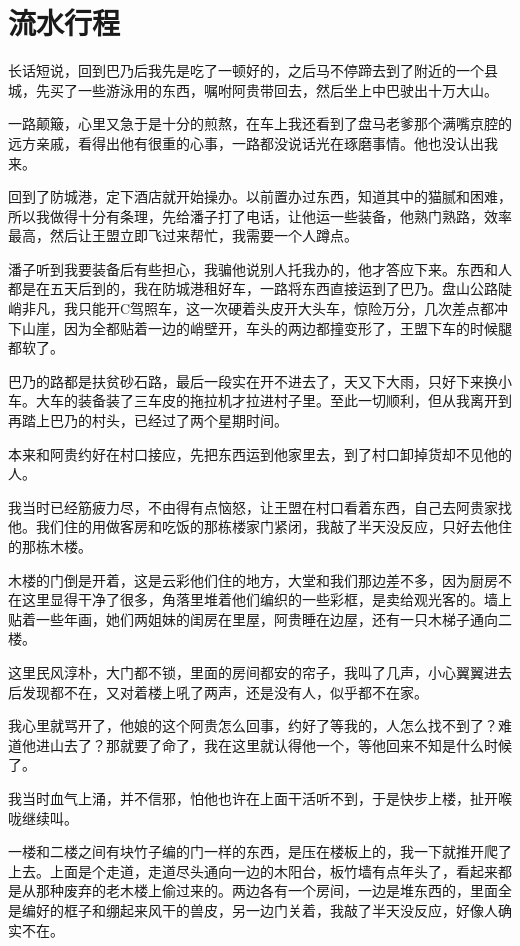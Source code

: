 \chapter{流水行程}

长话短说，回到巴乃后我先是吃了一顿好的，之后马不停蹄去到了附近的一个县城，先买了一些游泳用的东西，嘱咐阿贵带回去，然后坐上中巴驶出十万大山。

一路颠簸，心里又急于是十分的煎熬，在车上我还看到了盘马老爹那个满嘴京腔的远方亲戚，看得出他有很重的心事，一路都没说话光在琢磨事情。他也没认出我来。

回到了防城港，定下酒店就开始操办。以前置办过东西，知道其中的猫腻和困难，所以我做得十分有条理，先给潘子打了电话，让他运一些装备，他熟门熟路，效率最高，然后让王盟立即飞过来帮忙，我需要一个人蹲点。

潘子听到我要装备后有些担心，我骗他说别人托我办的，他才答应下来。东西和人都是在五天后到的，我在防城港租好车，一路将东西直接运到了巴乃。盘山公路陡峭非凡，我只能开C驾照车，这一次硬着头皮开大头车，惊险万分，几次差点都冲下山崖，因为全都贴着一边的峭壁开，车头的两边都撞变形了，王盟下车的时候腿都软了。

巴乃的路都是扶贫砂石路，最后一段实在开不进去了，天又下大雨，只好下来换小车。大车的装备装了三车皮的拖拉机才拉进村子里。至此一切顺利，但从我离开到再踏上巴乃的村头，已经过了两个星期时间。

本来和阿贵约好在村口接应，先把东西运到他家里去，到了村口卸掉货却不见他的人。

我当时已经筋疲力尽，不由得有点恼怒，让王盟在村口看着东西，自己去阿贵家找他。我们住的用做客房和吃饭的那栋楼家门紧闭，我敲了半天没反应，只好去他住的那栋木楼。

木楼的门倒是开着，这是云彩他们住的地方，大堂和我们那边差不多，因为厨房不在这里显得干净了很多，角落里堆着他们编织的一些彩框，是卖给观光客的。墙上贴着一些年画，她们两姐妹的闺房在里屋，阿贵睡在边屋，还有一只木梯子通向二楼。

这里民风淳朴，大门都不锁，里面的房间都安的帘子，我叫了几声，小心翼翼进去后发现都不在，又对着楼上吼了两声，还是没有人，似乎都不在家。

我心里就骂开了，他娘的这个阿贵怎么回事，约好了等我的，人怎么找不到了？难道他进山去了？那就要了命了，我在这里就认得他一个，等他回来不知是什么时候了。

我当时血气上涌，并不信邪，怕他也许在上面干活听不到，于是快步上楼，扯开喉咙继续叫。

一楼和二楼之间有块竹子编的门一样的东西，是压在楼板上的，我一下就推开爬了上去。上面是个走道，走道尽头通向一边的木阳台，板竹墙有点年头了，看起来都是从那种废弃的老木楼上偷过来的。两边各有一个房间，一边是堆东西的，里面全是编好的框子和绷起来风干的兽皮，另一边门关着，我敲了半天没反应，好像人确实不在。

